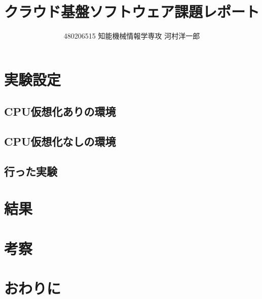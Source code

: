 \documentclass[twocolumn]{preport}
\title{クラウド基盤ソフトウェア課題レポート}
\author{480206515 知能機械情報学専攻 河村洋一郎}
\begin{document}
\pagestyle{empty}
\maketitle
\thispagestyle{empty}
\sloppy

\section{実験設定}
\subsection{CPU仮想化ありの環境}
\subsection{CPU仮想化なしの環境}
\subsection{行った実験}

\section{結果}


\section{考察}





\section{おわりに}



\end{document}
